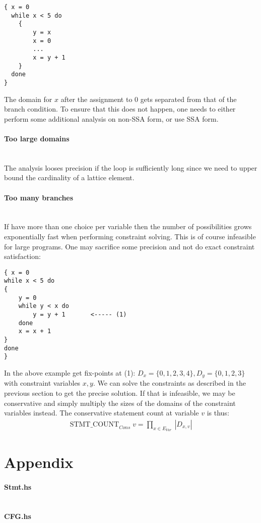 \documentclass[a4paper]{article}
\newcommand{\NL}[0]{ \hfill\\\noindent }
\begin{document}
\begin{verbatim}
{ x = 0
  while x < 5 do
  	{
  		y = x
  		x = 0
  		...
  		x = y + 1
  	}
  done 
}
\end{verbatim}
\noindent The domain for $x$ after the assignment to $0$ gets separated from that of the branch condition. To ensure that this does not happen, one needs to either perform some additional analysis on non-SSA form, or use SSA form.

\paragraph{Too large domains}\NL
The analysis looses precision if the loop is sufficiently long since we need to upper bound the cardinality of a lattice element.

\paragraph{Too many branches}\NL
If have more than one choice per variable then the number of possibilities grows exponentially fast when performing constraint solving. This is of course infeasible for large programs. One may sacrifice some precision and not do exact constraint satisfaction: 

\begin{verbatim}
{ x = 0
while x < 5 do
{
    y = 0
    while y < x do 
        y = y + 1       <----- (1)
    done 
    x = x + 1
}
done
}
\end{verbatim}
\noindent
In the above example get fix-points at (1): $D_x = \{0,1,2,3,4\}, D_y = \{0,1,2,3\}$ with constraint variables $x, y$. We can solve the constraints as described in the previous section to get the precise solution. If that is infeasible, we may be conservative and simply multiply the sizes of the domains of the constraint variables instead. The conservative statement count at variable $v$ is thus:
\begin{align*}
\text{STMT\_COUNT}_{Cons}\;v = \prod_{ x \in E_{Var}\;} |D_{x,v}|
\end{align*}

%

\newpage
\section{Appendix}
\paragraph{Stmt.hs}
\inputminted{haskell}{../src/Stmt.hs}
\newpage
\paragraph{CFG.hs}
\inputminted{haskell}{../src/CFG.hs}

%
\end{document}
